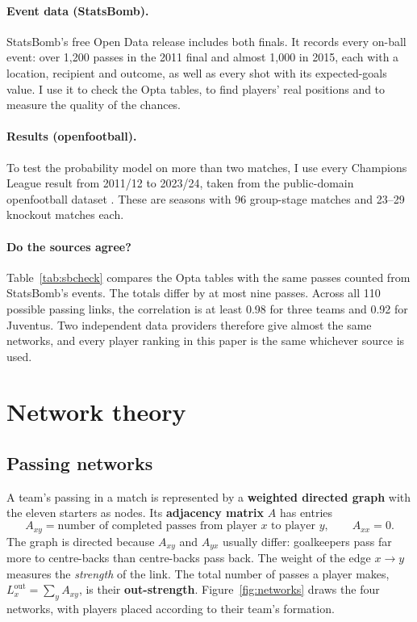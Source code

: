 \documentclass[11pt,a4paper]{article}
\begin{document}
\paragraph{Event data (StatsBomb).} StatsBomb's free Open Data release \cite{statsbomb} includes both finals. It records every on-ball event: over 1{,}200 passes in the 2011 final and almost 1{,}000 in 2015, each with a location, recipient and outcome, as well as every shot with its expected-goals value. I use it to check the Opta tables, to find players' real positions and to measure the quality of the chances.

\paragraph{Results (openfootball).} To test the probability model on more than two matches, I use every Champions League result from 2011/12 to 2023/24, taken from the public-domain openfootball dataset \cite{openfootball}. These are \nSeasons{} seasons with 96 group-stage matches and 23--29 knockout matches each.

\paragraph{Do the sources agree?} Table~\ref{tab:sbcheck} compares the Opta tables with the same passes counted from StatsBomb's events. The totals differ by at most nine passes. Across all 110 possible passing links, the correlation is at least 0.98 for three teams and 0.92 for Juventus. Two independent data providers therefore give almost the same networks, and every player ranking in this paper is the same whichever source is used.



\section{Network theory}\label{sec:networks}

\subsection{Passing networks}

A team's passing in a match is represented by a \textbf{weighted directed graph} with the eleven starters as nodes. Its \textbf{adjacency matrix} $A$ has entries
\[
A_{xy} = \text{number of completed passes from player } x \text{ to player } y, \qquad A_{xx} = 0 .
\]
The graph is directed because $A_{xy}$ and $A_{yx}$ usually differ: goalkeepers pass far more to centre-backs than centre-backs pass back. The weight of the edge $x\to y$ measures the \emph{strength} of the link. The total number of passes a player makes, $L^{\text{out}}_x = \sum_y A_{xy}$, is their \textbf{out-strength}. Figure~\ref{fig:networks} draws the four networks, with players placed according to their team's formation.
\end{document}
